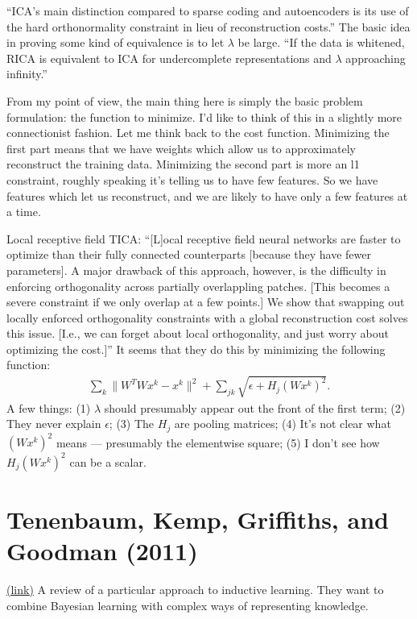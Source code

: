 \documentclass[12pt]{report}
\newcommand{\link}[2]{\href{#1}{#2}}
\begin{document}
``ICA's main distinction compared to sparse coding and autoencoders is
its use of the hard orthonormality constraint in lieu of
reconstruction costs.''  The basic idea in proving some kind of
equivalence is to let $\lambda$ be large.  ``If the data is whitened,
RICA is equivalent to ICA for undercomplete representations and
$\lambda$ approaching infinity.''

From my point of view, the main thing here is simply the basic problem
formulation: the function to minimize.  I'd like to think of this in a
slightly more connectionist fashion.  Let me think back to the cost
function.  Minimizing the first part means that we have weights which
allow us to approximately reconstruct the training data.  Minimizing
the second part is more an l1 constraint, roughly speaking it's
telling us to have few features.  So we have features which let us
reconstruct, and we are likely to have only a few features at a time.

Local receptive field TICA: ``[L]ocal receptive field neural networks
are faster to optimize than their fully connected counterparts
[because they have fewer parameters].  A major drawback of this
approach, however, is the difficulty in enforcing orthogonality across
partially overlappling patches.  [This becomes a severe constraint if
we only overlap at a few points.]  We show that swapping out locally
enforced orthogonality constraints with a global reconstruction cost
solves this issue. [I.e., we can forget about local orthogonality, and
just worry about optimizing the cost.]''  It seems that they do this
by minimizing the following function:
\begin{eqnarray}
  \sum_k \| W^T W x^k-x^k\|^2+ \sum_{jk} \sqrt{\epsilon+H_j (Wx^k)^2}.
\end{eqnarray}
A few things: (1) $\lambda$ should presumably appear out the front of
the first term; (2) They never explain $\epsilon$; (3) The $H_j$ are
pooling matrices; (4) It's not clear what $(Wx^k)^2$ means ---
presumably the elementwise square; (5) I don't see how $H_j (Wx^k)^2$
can be a scalar.

\section{Tenenbaum, Kemp, Griffiths, and Goodman (2011)}

\link{http://scholar.google.ca/scholar?cluster=2667398573353002097&hl=en&as_sdt=0,5}{(link)}
A review of a particular approach to inductive learning.  They want to
combine Bayesian learning with complex ways of representing knowledge.
\end{document}

